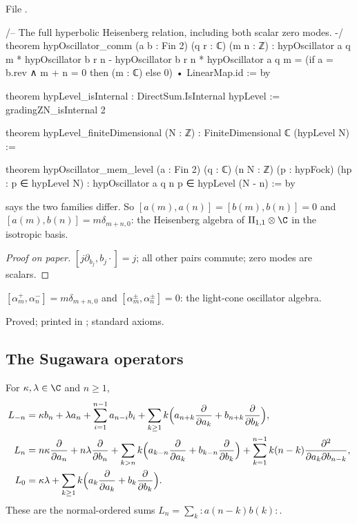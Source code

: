 \noindent File .
\begin{leancode}
/-- The full hyperbolic Heisenberg relation, including both scalar zero modes. -/
theorem hypOscillator_comm (a b : Fin 2) (q r : ℂ) (m n : ℤ) :
    hypOscillator a q m * hypOscillator b r n -
      hypOscillator b r n * hypOscillator a q m =
    (if a = b.rev ∧ m + n = 0 then (m : ℂ) else 0) • LinearMap.id := by

theorem hypLevel_isInternal : DirectSum.IsInternal hypLevel := gradingZN_isInternal 2

theorem hypLevel_finiteDimensional (N : ℤ) : FiniteDimensional ℂ (hypLevel N) :=

theorem hypOscillator_mem_level (a : Fin 2) (q : ℂ) (n N : ℤ) (p : hypFock)
    (hp : p ∈ hypLevel N) : hypOscillator a q n p ∈ hypLevel (N - n) := by
\end{leancode}

\begin{dictionary}
 says the two families differ.  So $[a(m),a(n)]=[b(m),b(n)]=0$ and $[a(m),b(n)]=m\delta_{m+n,0}$:
the Heisenberg algebra of $\chseventeenII\otimes\C$ in the isotropic basis.
\end{dictionary}

\begin{proof}[Proof on paper]
$[j\partial_{b_j},b_j\cdot]=j$; all other pairs commute; zero modes are scalars.
\end{proof}

\begin{physics}
$[\alpha^+_m,\alpha^-_n]=m\delta_{m+n,0}$ and $[\alpha^\pm_m,\alpha^\pm_n]=0$: the light-cone oscillator algebra.
\end{physics}

\begin{status}
Proved; printed in ; standard axioms.
\end{status}

\subsection{The Sugawara operators}

\begin{definition}\label{ch17:def:hypsugawara}
For $\kappa,\lambda\in\C$ and $n\ge1$,
\begin{align*}
L_{-n}&=\kappa b_n+\lambda a_n+\sum_{i=1}^{n-1}a_{n-i}b_i+\sum_{k\ge1}k\Bigl(a_{n+k}\frac{\partial}{\partial a_k}+b_{n+k}\frac{\partial}{\partial b_k}\Bigr),\\
L_{n}&=n\kappa\frac{\partial}{\partial a_n}+n\lambda\frac{\partial}{\partial b_n}+\sum_{k>n}k\Bigl(a_{k-n}\frac{\partial}{\partial a_k}+b_{k-n}\frac{\partial}{\partial b_k}\Bigr)
  +\sum_{k=1}^{n-1}k(n-k)\frac{\partial^2}{\partial a_k\partial b_{n-k}},\\
L_0&=\kappa\lambda+\sum_{k\ge1}k\Bigl(a_k\frac{\partial}{\partial a_k}+b_k\frac{\partial}{\partial b_k}\Bigr).
\end{align*}
These are the normal-ordered sums $L_n=\sum_k{:}a(n-k)b(k){:}$.
\end{definition}

